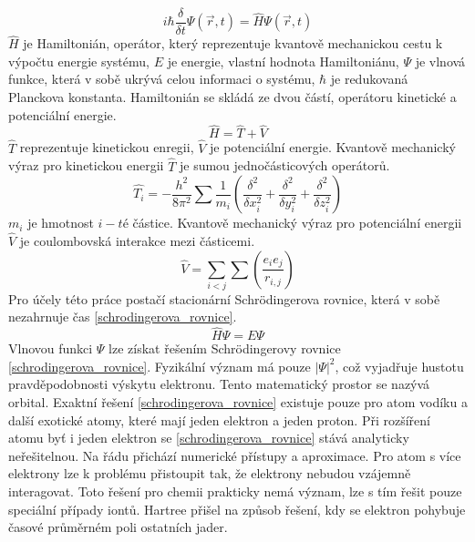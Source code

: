 \documentclass[
  digital, %
  table,   %
  lof,     %
  lot,     %
]{fithesis3}
\begin{document}
\begin{equation}
i \hbar \frac{\delta}{\delta t} \Psi (\vec{r},t)=\widehat{H} \Psi(\vec{r},t)
\label{SCH_time_dependent}
\end{equation}
$\widehat{H}$ je Hamiltonián, operátor, který reprezentuje kvantově mechanickou cestu k výpočtu energie systému, $E$ je energie, vlastní hodnota Hamiltoniánu, $\Psi$ je vlnová funkce, která v sobě ukrývá celou informaci o systému, $\hbar$ je redukovaná Planckova konstanta. Hamiltonián se skládá ze dvou částí, operátoru kinetické a potenciální energie.
\begin{equation}
\widehat{H} = \widehat{T} + \widehat{V}
\end{equation}
$\widehat{T}$ reprezentuje kinetickou enregii, $\widehat{V}$ je potenciální energie. Kvantově mechanický výraz pro kinetickou energii $\widehat{T}$ je sumou jednočásticových operátorů. 
\begin{equation}
\widehat{T_i} = - \frac{h^2}{8 \pi ^2} \sum \frac{1}{m_i} \left( \frac{\delta^2}{\delta x_i^2} +\frac{\delta^2}{\delta y_i^2} +\frac{\delta^2}{\delta z_i^2} \right)
\end{equation}
$m_i$ je hmotnost $i-té$ částice. Kvantově mechanický výraz pro potenciální energii $\widehat{V}$ je coulombovská interakce mezi částicemi.
\begin{equation}
\widehat{V} = \sum_{i<j}\sum \left( \frac{e_i e_j}{r_{i,j}}\right)
\end{equation}
 Pro účely této práce postačí stacionární Schrödingerova rovnice, která v sobě nezahrnuje čas \ref{schrodingerova_rovnice}.\\
 \begin{equation}
\widehat{H}\Psi = E \Psi
\label{schrodingerova_rovnice}
\end{equation}
Vlnovou funkci $\Psi$ lze získat řešením Schrödingerovy rovnice \ref{schrodingerova_rovnice}. Fyzikální význam má pouze $|\Psi|^2$, což vyjadřuje hustotu pravděpodobnosti výskytu elektronu. Tento matematický prostor se nazývá orbital. Exaktní řešení \ref{schrodingerova_rovnice} existuje pouze pro atom vodíku a další exotické atomy, které mají jeden elektron a jeden proton. Při rozšíření atomu byť i jeden elektron se \ref{schrodingerova_rovnice} stává analyticky neřešitelnou. Na řádu přichází numerické přístupy a aproximace. Pro atom s více elektrony lze k problému přistoupit tak, že elektrony nebudou vzájemně interagovat. Toto řešení pro chemii prakticky nemá význam, lze s tím řešit pouze speciální případy iontů. Hartree přišel na způsob řešení, kdy se elektron pohybuje časové průměrném poli ostatních jader. \cite{warren1986ab}
\end{document}
